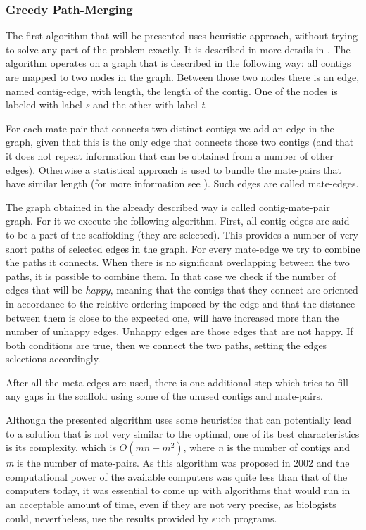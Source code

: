 \documentclass[11pt]{article}
\begin{document}
\subsubsection{Greedy Path-Merging} %
\label{ssub:Greedy Path-Merging}
The first algorithm that will be presented uses heuristic approach, without
trying to solve any part of the problem exactly. It is described in more details
in \cite{greedy-path-merging}. The algorithm operates on a graph that is
described in the following way: all contigs are mapped to two nodes in the
graph. Between those two nodes there is an edge, named contig-edge, with length,
the length of the contig. One of the nodes is labeled with label \emph{s} and
the other with label \emph{t}.

For each mate-pair that connects two distinct contigs we add an edge in the
graph, given that this is the only edge that connects those two contigs (and that
it does not repeat information that can be obtained from a number of other
edges). Otherwise a statistical approach is used to bundle the mate-pairs that
have similar length (for more information see \cite{greedy-path-merging}). Such
edges are called mate-edges.

The graph obtained in the already described way is called contig-mate-pair
graph. For it we execute the following algorithm. First, all contig-edges are
said to be a part of the scaffolding (they are selected). This provides a number
of very short paths of selected edges in the graph. For every mate-edge we try
to combine the paths it connects. When there is no significant overlapping
between the two paths, it is possible to combine them. In that case we check if
the number of edges that will be \emph{happy}, meaning that the contigs that
they connect are oriented in accordance to the relative ordering imposed by the
edge and that the distance between them is close to the expected one, will have
increased more than the number of unhappy edges. Unhappy edges are those edges
that are not happy. If both conditions are true, then we connect the two paths,
setting the edges selections accordingly.

After all the meta-edges are used, there is one additional step which tries to
fill any gaps in the scaffold using some of the unused contigs and mate-pairs.

Although the presented algorithm uses some heuristics that can potentially lead
to a solution that is not very similar to the optimal, one of its best
characteristics is its complexity, which is $O(m n + m ^ 2)$, where \emph{n} is
the number of contigs and \emph{m} is the number of mate-pairs. As this
algorithm was proposed in 2002 and the computational power of the available
computers was quite less than that of the computers today, it was essential to
come up with algorithms that would run in an acceptable amount of time, even if
they are not very precise, as biologists could, nevertheless, use the results
provided by such programs.
\end{document}
